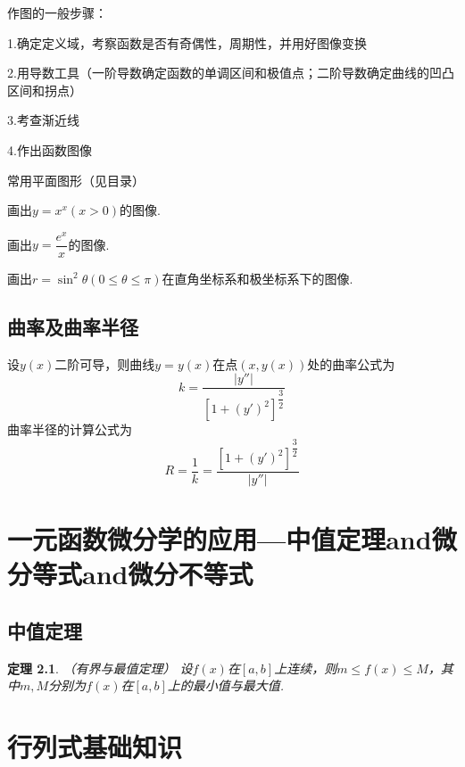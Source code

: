 \documentclass[12pt, a4paper, oneside]{ctexbook}
\newtheorem{theorem}{定理}[section]
\begin{document}
作图的一般步骤：

1.确定定义域，考察函数是否有奇偶性，周期性，并用好图像变换

2.用导数工具（一阶导数确定函数的单调区间和极值点；二阶导数确定曲线的凹凸区间和拐点）

3.考查渐近线

4.作出函数图像

\hspace*{\fill}

常用平面图形（见目录）

\hspace*{\fill}

画出$y=x^x(x>0)$的图像.

\hspace*{\fill}

画出$y=\dfrac{e^x}{x}$的图像.

\hspace*{\fill}

画出$r=\sin ^ 2 \theta (0\leq \theta \leq \pi)$在直角坐标系和极坐标系下的图像.

\hspace*{\fill}


\section{曲率及曲率半径}

设$y(x)$二阶可导，则曲线$y=y(x)$在点$(x,y(x))$处的曲率公式为\[k=\dfrac{|y''|}{[1+(y')^2]^{\dfrac{3}{2}}}\]曲率半径的计算公式为\[R=\dfrac{1}{k}=\dfrac{[1+(y')^2]^{\dfrac{3}{2}}}{|y''|}\]

\chapter{一元函数微分学的应用---中值定理and微分等式and微分不等式}

\section{中值定理}

\begin{theorem}
  （有界与最值定理） 设$f(x)$在$[a,b]$上连续，则$m\leq f(x) \leq M$，其中$m,M$分别为$f(x)$在$[a,b]$上的最小值与最大值.
\end{theorem}



\chapter{行列式基础知识}
\end{document}
